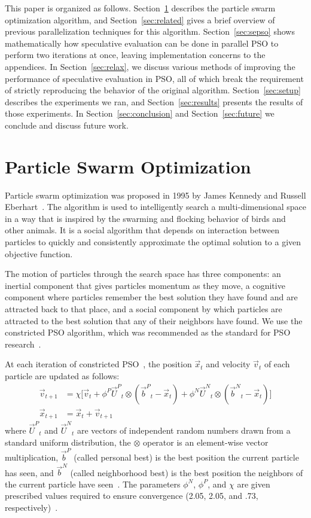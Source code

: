 \documentclass[smallcondensed]{svjour3}
\renewcommand{\sec}[1]{Section~\ref{sec:#1}}
\providecommand{\pers}{\ensuremath{P}}
\providecommand{\neigh}{\ensuremath{N}}
\providecommand{\nURand}{\ensuremath{\Vec{U}^\neigh}}
\providecommand{\pURand}{\ensuremath{\Vec{U}^\pers}}
\providecommand{\ppos}{\ensuremath{\Vec{x}}}
\providecommand{\pvel}{\ensuremath{\Vec{v}}}
\providecommand{\nbest}{\ensuremath{\Vec{b}^\neigh}}
\providecommand{\pbest}{\ensuremath{\Vec{b}^\pers}}
\providecommand{\constriction}{\ensuremath{\chi}}
\providecommand{\ncoeff}{\ensuremath{\phi^\neigh}}
\providecommand{\pcoeff}{\ensuremath{\phi^\pers}}
\begin{document}
This paper is organized as follows. \sec{pso} describes the particle swarm
optimization algorithm, and \sec{related} gives a brief overview of previous
parallelization techniques for this algorithm.  \sec{sepso} shows
mathematically how speculative evaluation can be done in parallel PSO to
perform two iterations at once, leaving implementation concerns to the
appendices.  In \sec{relax}, we discuss various methods of improving the
performance of speculative evaluation in PSO, all of which break the
requirement of strictly reproducing the behavior of the original algorithm.
\sec{setup} describes the experiments we ran, and \sec{results} presents the
results of those experiments.  In \sec{conclusion} and \sec{future} we conclude
and discuss future work.

\section{Particle Swarm Optimization}
\label{sec:pso}

Particle swarm optimization was proposed in 1995 by James Kennedy and Russell
Eberhart~\citep{kennedy-1995-particle-swarm-optimization}.  The algorithm is
used to intelligently search a multi-dimensional space in a way that is
inspired by the swarming and flocking behavior of birds and other animals. It
is a social algorithm that depends on interaction between particles to quickly
and consistently approximate the optimal solution to a given objective
function.

The motion of particles through the search space has three components: an
inertial component that gives particles momentum as they move, a cognitive
component where particles remember the best solution they have found and are
attracted back to that place, and a social component by which particles are
attracted to the best solution that any of their neighbors have found.  We use
the constricted PSO algorithm, which was recommended as the standard for PSO
research~\citep{bratton-2007-defining-a-standard-for-pso}.

At each iteration of constricted PSO~\citep{clerc-2002-constricted-pso}, the
position $\ppos_t$ and velocity $\pvel_t$ of each particle are updated as
follows:
\begin{align}
\label{eq:velupdate}
	\pvel_{t+1} &=
		\constriction \bigl[ \pvel_t
			+ \pcoeff\pURand_{t}\otimes(\pbest_{t} - \ppos_{t}) +
			\ncoeff\nURand_{t}\otimes(\nbest_{t} - \ppos_{t})
		\bigr] \\
\label{eq:posupdate}
	\ppos_{t+1} &= \ppos_{t} + \pvel_{t+1}
\end{align}
where \( \pURand_{t} \) and \( \nURand_{t} \) are vectors of independent random
numbers drawn from a standard uniform distribution, the \( \otimes \) operator
is an element-wise vector multiplication, $\pbest$ (called personal best) is
the best position the current particle has seen, and $\nbest$ (called
neighborhood best) is the best position the neighbors of the current particle
have seen~\citep{bratton-2007-defining-a-standard-for-pso}.  The parameters \(
\ncoeff \), \( \pcoeff \), and \( \constriction \) are given prescribed values
required to ensure convergence (2.05, 2.05, and .73,
respectively)~\citep{clerc-2002-constricted-pso}.
\end{document}
